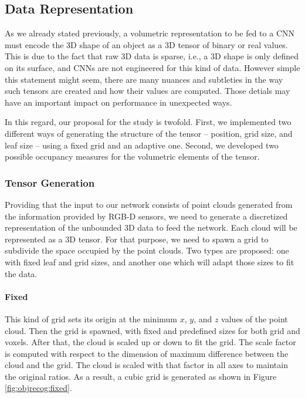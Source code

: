 \subsection{Data Representation}
\label{cha:objrecog:sec:study:subsec:representation}

As we already stated previously, a volumetric representation to be fed to a \acs{CNN} must encode the \acs{3D} shape of an object as a \acs{3D} tensor of binary or real values. This is due to the fact that raw \acs{3D} data is sparse, i.e., a \acs{3D} shape is only defined on its surface, and \acp{CNN} are not engineered for this kind of data. However simple this statement might seem, there are many nuances and subtleties in the way such tensors are created and how their values are computed. Those detials may have an important impact on performance in unexpected ways.

In this regard, our proposal for the study is twofold. First, we implemented two different ways of generating the structure of the tensor -- position, grid size, and leaf size -- using a fixed grid and an adaptive one. Second, we developed two possible occupancy measures for the volumetric elements of the tensor.

\subsubsection{Tensor Generation}
\label{cha:objrecog:sec:study:subsec:representation:subsubsec:tensor}

Providing that the input to our network consists of point clouds generated from the information provided by \acs{RGB-D} sensors, we need to generate a discretized representation of the unbounded \acs{3D} data to feed the network. Each cloud will be represented as a \acs{3D} tensor. For that purpose, we need to spawn a grid to subdivide the space occupied by the point clouds. Two types are proposed: one with fixed leaf and grid sizes, and another one which will adapt those sizes to fit the data.

\paragraph{Fixed}

This kind of grid sets its origin at the minimum $x$, $y$, and $z$ values of the point cloud. Then the grid is spawned, with fixed and predefined sizes for both grid and voxels. After that, the cloud is scaled up or down to fit the grid. The scale factor is computed with respect to the dimension of maximum difference between the cloud and the grid. The cloud is scaled with that factor in all axes to maintain the original ratios. As a result, a cubic grid is generated as shown in Figure \ref{fig:objrecog:fixed}.

